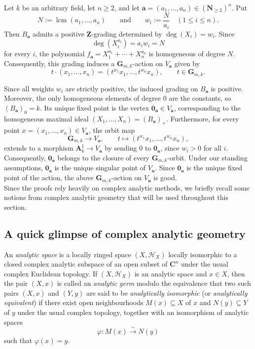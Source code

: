 \documentclass[10pt,a4paper]{amsart}
\numberwithin{equation}{section}
\numberwithin{figure}{section}
\numberwithin{equation}{section}
\newcommand{\A}{\mathbf{A}}
\newcommand{\C}{\mathbf{C}}
\newcommand{\G}{\mathbf{G}}
\newcommand{\N}{\mathbf{N}}
\newcommand{\oo}{\mathbf{0}}
\newcommand{\Z}{\mathbf{Z}}
\newcommand{\ba}{\mathbf{a}}
\begin{document}
Let $k$ be an arbitrary field, let $n\geq 2$, and let $\ba=(a_1,\ldots,a_n)\in(\N_{\geq 2})^n$. Put
\[
N:=\operatorname{lcm}(a_1,\ldots,a_n)
\qquad\text{and}\qquad
w_i:=\frac{N}{a_i}
\quad (1\leq i\leq n).
\]
Then $B_\ba$ admits a positive $\Z$-grading determined by $\deg(X_i)=w_i$. Since
\[
\deg(X_i^{a_i})=a_iw_i=N
\]
for every $i$, the polynomial $f_\ba=X_1^{a_1}+\cdots+X_n^{a_n}$ is homogeneous of degree $N$. Consequently, this grading induces a $\G_{m,k}$-action on $V_\ba$ given by
\[
t\cdot(x_1,\ldots,x_n)
= (t^{w_1}x_1,\ldots,t^{w_n}x_n),
\qquad
t\in\G_{m,k}.
\]

Since all weights $w_i$ are strictly positive, the induced grading on $B_\ba$ is positive. Moreover, the only homogeneous elements of degree $0$ are the constants, so $(B_\ba)_0=k$. Its unique fixed point is the vertex $\oo_\ba\in V_\ba$, corresponding to the homogeneous maximal ideal $(X_1,\ldots,X_n)=(B_\ba)_+$. Furthermore, for every point $x=(x_1,\ldots,x_n)\in V_\ba$, the orbit map
\[
\G_{m,k}\longrightarrow V_\ba,
\qquad
t\longmapsto
(t^{w_1}x_1,\ldots,t^{w_n}x_n),
\]
extends to a morphism $\A^1_k\to V_\ba$ by sending $0$ to $\oo_\ba$, since $w_i>0$ for all $i$. Consequently, $\oo_\ba$ belongs to the closure of every $\G_{m,k}$-orbit. Under our standing assumptions, $\oo_\ba$ is the unique singular point of $V_\ba$. Since $\oo_\ba$ is the unique fixed point of the action, the above $\G_{m,k}$-action on $V_\ba$ is good.\\

Since the proofs rely heavily on complex analytic methods, we briefly recall some notions from complex analytic geometry that will be used throughout this section.

\subsection{A quick glimpse of complex analytic geometry}\label{subse2.2}
An \emph{analytic space} is a locally ringed space $(X,\mathcal{H}_X)$ locally isomorphic to a closed complex analytic subspace of an open subset of $\C^n$ under the usual complex Euclidean topology. If $(X,\mathcal{H}_X)$ is an analytic space and $x \in X$, then the pair $(X,x)$ is called an \emph{analytic germ} modulo the equivalence that two such pairs $(X,x)$ and $(Y,y)$ are said to be \emph{analytically isomorphic} (or \emph{analytically equivalent}) if there exist open neighbourhoods $M(x) \subseteq X$ of $x$ and $N(y) \subseteq Y$ of $y$ under the usual complex topology, together with an isomorphism of analytic spaces
\[
\varphi : M(x) \xrightarrow{\sim} N(y)
\]
such that $\varphi(x)=y$.
\end{document}

